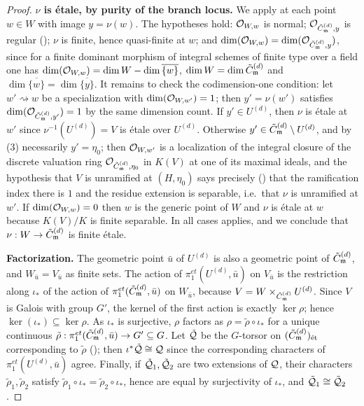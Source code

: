 \begin{proof}
    \textbf{$\nu$ is \'etale, by purity of the branch locus.}
    We apply  at each point $w \in W$ with image $y = \nu(w)$. The hypotheses hold:
    $\mathcal{O}_{W,w}$ is normal; $\mathcal{O}_{\tilde{C}_{\mathfrak{m}}^{(d)},y}$ is regular ();
    $\nu$ is finite, hence quasi-finite at $w$; and
    $\dim(\mathcal{O}_{W,w}) = \dim(\mathcal{O}_{\tilde{C}_{\mathfrak{m}}^{(d)},y})$, since for a finite dominant morphism of integral schemes
    of finite type over a field one has
    $\dim(\mathcal{O}_{W,w}) = \dim W - \dim \overline{\{w\}}$, $\dim W = \dim \tilde{C}_{\mathfrak{m}}^{(d)}$ and
    $\dim \overline{\{w\}} = \dim \overline{\{y\}}$.
    It remains to check the codimension-one condition: let $w' \rightsquigarrow w$ be a specialization
    with $\dim(\mathcal{O}_{W, w'}) = 1$; then $y' = \nu(w')$ satisfies $\dim(\mathcal{O}_{\tilde{C}_{\mathfrak{m}}^{(d)}, y'}) = 1$
    by the same dimension count. If $y' \in U^{(d)}$, then $\nu$ is \'etale at $w'$ since
    $\nu^{-1}(U^{(d)}) = V$ is \'etale over $U^{(d)}$. Otherwise
    $y' \in \tilde{C}_{\mathfrak{m}}^{(d)} \setminus U^{(d)}$, and by (3) necessarily
    $y' = \eta_0$; then $\mathcal{O}_{W, w'}$ is a localization of the integral closure of the discrete valuation
    ring $\mathcal{O}_{\tilde{C}_{\mathfrak{m}}^{(d)},\eta_0}$ in $K(V)$ at one of its maximal ideals, and the hypothesis that $V$ is
    unramified at $(H, \eta_0)$ says precisely () that the
    ramification index there is $1$ and the residue extension is separable, i.e.\ that $\nu$ is
    unramified at $w'$. If $\dim(\mathcal{O}_{W,w}) = 0$ then $w$ is the generic point of $W$ and $\nu$ is \'etale
    at $w$ because $K(V)/K$ is finite separable. In all cases  applies, and we conclude
    that $\nu : W \to \tilde{C}_{\mathfrak{m}}^{(d)}$ is finite \'etale.

    \textbf{Factorization.}
    The geometric point $\bar{u}$ of $U^{(d)}$ is also a geometric point of $\tilde{C}_{\mathfrak{m}}^{(d)}$, and
    $W_{\bar{u}} = V_{\bar{u}}$ as finite sets. The action of $\pi_1^{et}(U^{(d)}, \bar u)$ on
    $V_{\bar u}$ is the restriction along $\iota_*$ of the action of $\pi_1^{et}(\tilde{C}_{\mathfrak{m}}^{(d)}, \bar u)$ on
    $W_{\bar u}$, because $V = W \times_{\tilde{C}_{\mathfrak{m}}^{(d)}} U^{(d)}$. Since $V$ is Galois with group $G'$, the
    kernel of the first action is exactly $\ker \rho$; hence
    $\ker(\iota_*) \subseteq \ker \rho$. As $\iota_*$ is surjective, $\rho$ factors as
    $\rho = \tilde{\rho} \circ \iota_*$ for a unique continuous
    $\tilde{\rho} : \pi_1^{et}(\tilde{C}_{\mathfrak{m}}^{(d)}, \bar u) \to G' \subseteq G$.
    Let $\tilde{\mathcal{Q}}$ be the $G$-torsor on $(\tilde{C}_{\mathfrak{m}}^{(d)})_{\text{\'et}}$ corresponding to $\tilde{\rho}$
    (); then
    $\iota^* \tilde{\mathcal{Q}} \cong \mathcal{Q}$ since the corresponding characters of $\pi_1^{et}(U^{(d)}, \bar u)$
    agree. Finally, if $\tilde{\mathcal{Q}}_1, \tilde{\mathcal{Q}}_2$ are two extensions of $\mathcal{Q}$, their characters
    $\tilde{\rho}_1, \tilde{\rho}_2$ satisfy $\tilde{\rho}_1 \circ \iota_* = \tilde{\rho}_2 \circ \iota_*$,
    hence are equal by surjectivity of $\iota_*$, and $\tilde{\mathcal{Q}}_1 \cong \tilde{\mathcal{Q}}_2$.
\end{proof}

